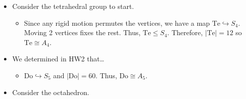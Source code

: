 \documentclass[../notes.tex]{subfiles}
\begin{document}
\begin{itemize}
\begin{itemize}
        \item Consider the tetrahedral group to start.
        \begin{itemize}
            \item Since any rigid motion permutes the vertices, we have a map $\text{Te}\hookrightarrow S_4$. Moving 2 vertices fixes the rest. Thus, $\text{Te}\leq S_4$. Therefore, $|\text{Te}|=12$ so $\text{Te}\cong A_4$.
        \end{itemize}
        \item We determined in HW2 that\dots
        \begin{itemize}
            \item $\text{Do}\hookrightarrow S_5$ and $|\text{Do}|=60$. Thus, $\text{Do}\cong A_5$.
        \end{itemize}
        \item Consider the octahedron.
        \begin{figure}[h!]
            \centering
\end{figure}
\end{itemize}
\end{itemize}
\end{document}
